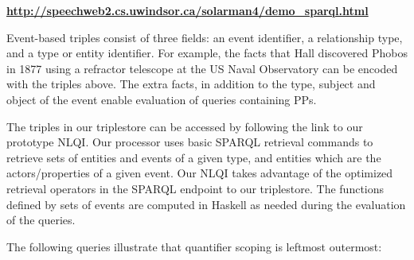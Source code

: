 \documentclass[../main.tex]{subfiles}
\begin{document}
\begin{refsection}

\begin{center}
	\textbf{\url{http://speechweb2.cs.uwindsor.ca/solarman4/demo_sparql.html}}
\end{center}


Event-based triples consist of three fields: an event identifier, a relationship type, and a type or
entity identifier. For example, the facts that Hall discovered Phobos in 1877 using a refractor
telescope at the US Naval Observatory can be encoded with the triples above.
The extra facts, in addition to the type, subject and object of the event enable evaluation of queries containing PPs.

The triples in our triplestore can be accessed by following the link to our prototype NLQI.
Our processor uses basic SPARQL retrieval commands to retrieve sets of entities and events of a given
type, and entities which are the actors/properties of a given event. Our NLQI takes
advantage of the optimized retrieval operators in the SPARQL endpoint to our triplestore. The
functions defined by sets of events are computed in Haskell as needed during the evaluation of the
queries.

The following queries illustrate that quantifier scoping is leftmost outermost:


\end{refsection}
\end{document}
